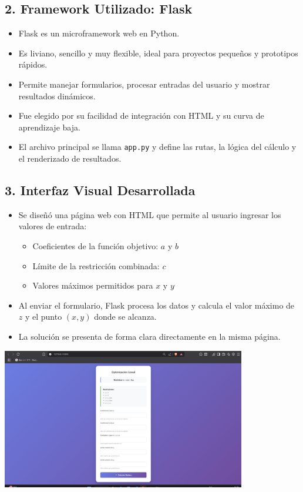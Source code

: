 \documentclass[a4paper,10pt]{article}
\begin{document}
\subsection*{2. Framework Utilizado: Flask}
\begin{itemize}
  \item Flask es un microframework web en Python.
  \item Es liviano, sencillo y muy flexible, ideal para proyectos peque\~nos y prototipos r\'apidos.
  \item Permite manejar formularios, procesar entradas del usuario y mostrar resultados din\'amicos.
  \item Fue elegido por su facilidad de integraci\'on con HTML y su curva de aprendizaje baja.
  \item El archivo principal se llama \texttt{app.py} y define las rutas, la l\'ogica del c\'alculo y el renderizado de resultados.
\end{itemize}

\subsection*{3. Interfaz Visual Desarrollada}
\begin{itemize}
  \item Se dise\~n\'o una p\'agina web con HTML que permite al usuario ingresar los valores de entrada:
  \begin{itemize}
    \item Coeficientes de la funci\'on objetivo: $a$ y $b$
    \item L\'imite de la restricci\'on combinada: $c$
    \item Valores m\'aximos permitidos para $x$ y $y$
  \end{itemize}
  \item Al enviar el formulario, Flask procesa los datos y calcula el valor m\'aximo de $z$ y el punto $(x, y)$ donde se alcanza.
  \item La soluci\'on se presenta de forma clara directamente en la misma p\'agina.
\end{itemize}

\begin{center}
\includegraphics[width=0.8\textwidth]{ejemplo_interfaz .png}
\end{center}
\end{document}
